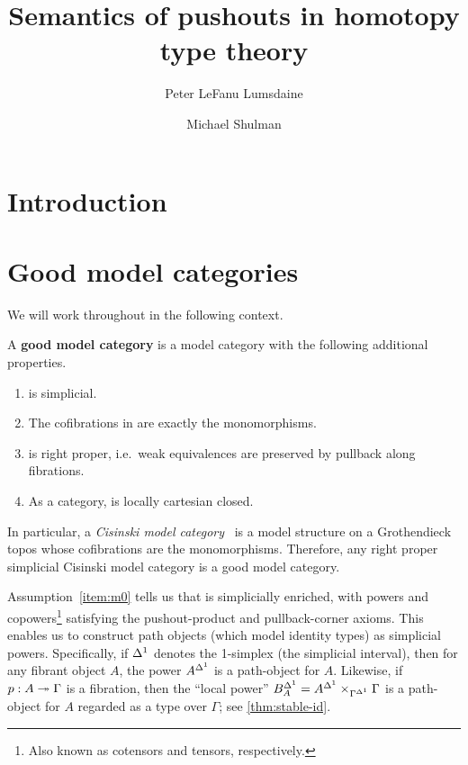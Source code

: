 \documentclass{amsart}
\title{Semantics of pushouts in homotopy type theory}
\author{Peter LeFanu Lumsdaine}
\author{Michael Shulman}
\begin{document}
\maketitle
\tableofcontents

\section{Introduction}
\label{sec:introduction}



\section{Good model categories}
\label{sec:model-categ-type}

We will work throughout in the following context.

\begin{defn}
  A \textbf{good model category} is a model category \sM with the following additional properties.
  \begin{enumerate}
  \item \sM is simplicial.\label{item:m0}
  \item The cofibrations in \sM are exactly the monomorphisms.\label{item:m1}
  \item \sM is right proper, i.e.\ weak equivalences are preserved by pullback along fibrations.\label{item:m2}
  \item As a category, \sM is locally cartesian closed.\label{item:m3}
  \end{enumerate}
\end{defn}

In particular, a \emph{Cisinski model category}~\cite{cisinski:topos,cisinski:presheaves} is a model structure on a Grothendieck topos whose cofibrations are the monomorphisms.
Therefore, any right proper simplicial Cisinski model category is a good model category.

Assumption~\ref{item:m0} tells us that \sM is simplicially enriched, with powers and copowers\footnote{Also known as cotensors and tensors, respectively.} satisfying the pushout-product and pullback-corner axioms.
This enables us to construct path objects (which model identity types) as simplicial powers.
Specifically, if ${\Delta^1}$ denotes the 1-simplex (the simplicial interval), then for any fibrant object $A$, the power $A^{\Delta^1}$ is a path-object for $A$.
Likewise, if $p:A\twoheadrightarrow \Gamma$ is a fibration, then the ``local power'' $B^{\Delta^1}_A = A^{\Delta^1} \times_{\Gamma^{\Delta^1}} \Gamma$ is a path-object for $A$ regarded as a type over $\Gamma$; see \cref{thm:stable-id}.
\end{document}
